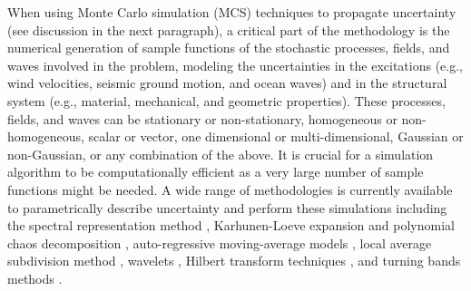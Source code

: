 When using Monte Carlo simulation (MCS) techniques to propagate uncertainty (see discussion in the next paragraph), a critical part of the methodology is the numerical generation of sample functions of the stochastic processes, fields, and waves involved in the problem, modeling the uncertainties in the excitations (e.g., wind velocities, seismic ground motion, and ocean waves) and in the structural system (e.g., material, mechanical, and geometric properties). These processes, fields, and waves can be stationary or non-stationary, homogeneous or non-homogeneous, scalar or vector, one dimensional or multi-dimensional, Gaussian or non-Gaussian, or any combination of the above. It is crucial for a simulation algorithm to be computationally efficient as a very large number of sample functions might be needed. A wide range of methodologies is currently available to parametrically describe uncertainty and perform these simulations including the spectral representation method \citep{li1991simulation, shinozuka1991simulation, shields2011simple, benowitz2015simulation}, Karhunen-Loeve expansion and polynomial chaos decomposition \citep{ghanem1991stochastic}, auto-regressive moving-average models \citep{spanos1983arma, deodatis1988autoregressive}, local average subdivision method \citep{fenton1990simulation}, wavelets \citep{zeldin1996random}, Hilbert transform techniques \citep{wang2014modeling}, and turning bands methods \citep{mantoglou1982turning}.

